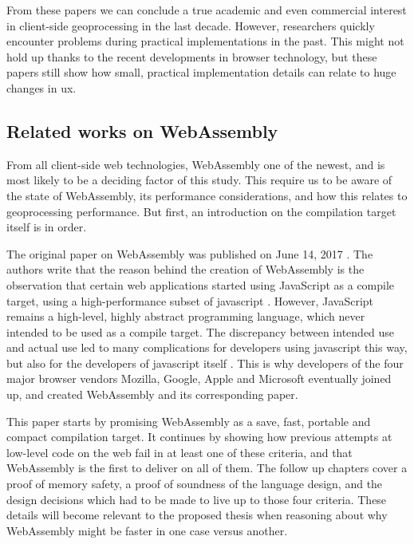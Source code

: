 
From these papers we can conclude a true academic and even commercial interest in client-side geoprocessing in the last decade. However, researchers quickly encounter problems during practical implementations in the past. This might not hold up thanks to the recent developments in browser technology, but these papers still show how small, practical implementation details can relate to huge changes in \ac{ux}. 


\subsection{Related works on WebAssembly}

From all client-side web technologies, WebAssembly one of the newest, and is most likely to be a deciding factor of this study. This require us to be aware of the state of WebAssembly, its performance considerations, and how this relates to geoprocessing performance. But first, an introduction on the compilation target itself is in order.

The original paper on WebAssembly was published on June 14, 2017 \cite{haas_bringing_2017}. The authors write that the reason behind the creation of WebAssembly is the observation that certain web applications started using JavaScript as a compile target, using a high-performance subset of javascript \cite{mozilla_asmjs_2013}. However, JavaScript remains a high-level, highly abstract programming language, which never intended to be used as a compile target. The discrepancy between intended use and actual use led to many complications for developers using javascript this way, but also for the developers of javascript itself \cite{haas_bringing_2017}. This is why developers of the four major browser vendors Mozilla, Google, Apple and Microsoft eventually joined up, and created WebAssembly and its corresponding paper. %

This paper starts by promising WebAssembly as a save, fast, portable and compact compilation target. It continues by showing how previous attempts at low-level code on the web fail in at least one of these criteria, and that WebAssembly is the first to deliver on all of them. The follow up chapters cover a proof of memory safety, a proof of soundness of the language design, and the design decisions which had to be made to live up to those four criteria. These details will become relevant to the proposed thesis when reasoning about why WebAssembly might be faster in one case versus another.

